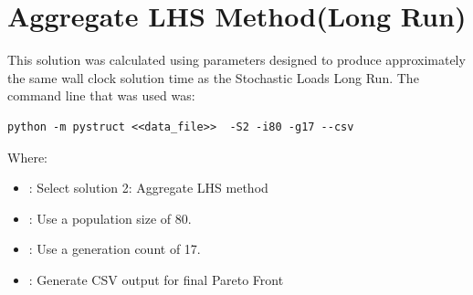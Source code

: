 \section{Aggregate LHS Method(Long Run)}
This solution was calculated using parameters designed to produce approximately the same wall clock solution time as the Stochastic Loads Long Run. The command line that was used was:

\begin{verbatim}
python -m pystruct <<data_file>>  -S2 -i80 -g17 --csv
\end{verbatim}

\noindent Where: 

\begin{itemize}
  \item {}: Select solution 2: Aggregate LHS method
  \item {}: Use a population size of 80. 
  \item {}: Use a generation count of 17. 
  \item {}: Generate CSV output for final Pareto Front
\end{itemize}

